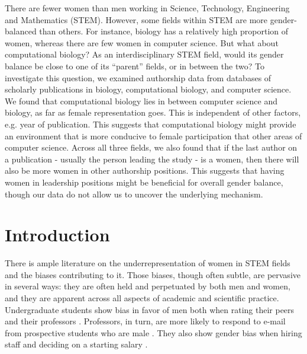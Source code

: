 \documentclass[10pt,letterpaper]{article}
\begin{document}
\begin{flushleft}
There are fewer women than men working in Science, Technology, Engineering and Mathematics (STEM). However, some fields within STEM are more gender-balanced than others. For instance, biology has a relatively high proportion of women, whereas there are few women in computer science. But what about computational biology? As an interdisciplinary STEM field, would its gender balance be close to one of its ``parent'' fields, or in between the two? To investigate this question, we examined authorship data from databases of scholarly publications in biology, computational biology, and computer science. We found that computational biology lies in between computer science and biology, as far as female representation goes. This is independent of other factors, e.g. year of publication. This suggests that computational biology might provide an environment that is more conducive to female participation that other areas of computer science. Across all three fields, we also found that if the last author on a publication - usually the person leading the study - is a women, then there will also be more women in other authorship positions. This suggests that having women in leadership positions might be beneficial for overall gender balance, though our data do not allow us to uncover the underlying mechanism.



\section{Introduction}
There is ample literature on the underrepresentation of women in STEM fields and the biases contributing to it. Those biases, though often subtle, are pervasive in several ways: they are often held and perpetuated by both men and women, and they are apparent across all aspects of academic and scientific practice. Undergraduate students show bias in favor of men both when rating their peers\cite{Grunspan2016} and their professors \cite{MacNell2014}. Professors, in turn, are more likely to respond to e-mail from prospective students who are male \cite{Milkman2015}. They also show gender bias when hiring staff and deciding on a starting salary \cite{Moss-Racusin2012}.


\end{flushleft}
\end{document}
